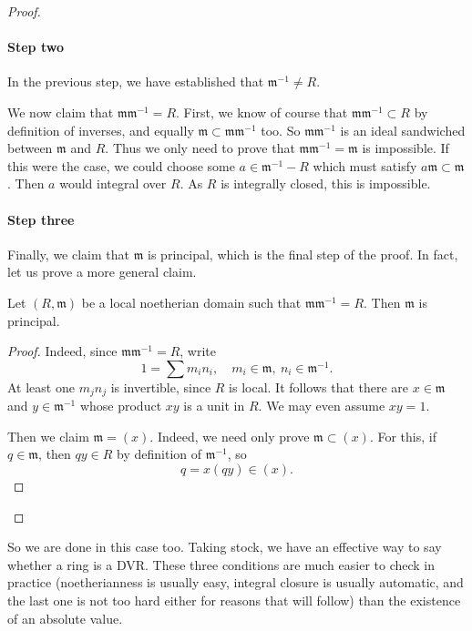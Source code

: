 \begin{proof}
\paragraph{Step two} In the previous step, we have established that
$\mathfrak{m}^{-1} \neq R$.

We now claim that $\mathfrak{m}\mathfrak{m}^{-1} = R$.  First, we know of course
that $\mathfrak{m}\mathfrak{m}^{-1} \subset R$ by definition of inverses,
and equally $\mathfrak{m} \subset \mathfrak{m}\mathfrak{m}^{-1}$ too.  So $\mathfrak{m}\mathfrak{m}^{-1}$ is an ideal sandwiched between $\mathfrak{m}$ and $R$.  
Thus we only need to prove that $\mathfrak{m} \mathfrak{m}^{-1} = \mathfrak{m}$
is impossible.  If this were the case, we could choose some $a \in
\mathfrak{m}^{-1} - R$ which must satisfy $a \mathfrak{m} \subset \mathfrak{m}$.
Then $a$ would integral over $R$. 
As $R$ is integrally closed, this is impossible.

\paragraph{Step three}

Finally, we  claim that $\mathfrak{m}$ is principal, which is the final step of
the proof.
In fact, let us prove a more general claim.

\begin{proposition} 
Let $(R, \mathfrak{m})$ be a local noetherian domain such that $\mathfrak{m}
\mathfrak{m}^{-1} = R$. Then $\mathfrak{m}$ is principal.
\end{proposition} 
\begin{proof} 
Indeed, since $\mathfrak{m} \mathfrak{m}^{-1} = R$, write
\[ 1 = \sum m_i n_i, \quad m_i \in \mathfrak{m}, \ n_i \in \mathfrak{m}^{-1}.\]
At least one $m_j n_j$ is invertible, since $R$ is local.
It follows that there are $x \in \mathfrak{m}$ and $y \in \mathfrak{m}^{-1}$
whose product $xy$ is a unit in $R$.
We may even assume $xy = 1$.

Then we claim $\mathfrak{m} = (x)$.  
Indeed, we need only prove $\mathfrak{m} \subset (x)$.  For this, if $q \in
\mathfrak{m}$, then $qy \in R$ by definition of $\mathfrak{m}^{-1}$, so  \[ q =
x(qy)  \in ( x).\]
\end{proof}

\end{proof} 

So we are done in this case too.  Taking stock, we have an effective way to say whether a ring is a DVR.  These three conditions are much easier to check in practice (noetherianness is usually easy, integral closure is usually automatic, and the last one is not too hard either for reasons that will follow) than the existence of an absolute value.


